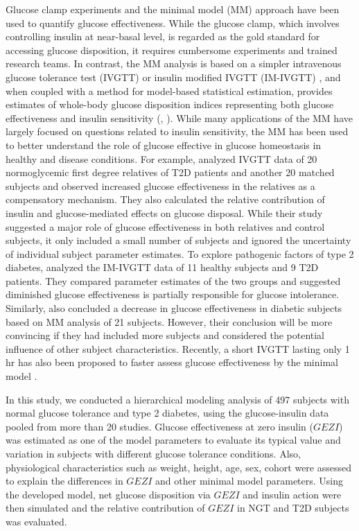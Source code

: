 \documentclass[utf8]{frontiersSCNS} %
\begin{document}
Glucose clamp experiments and the minimal model (MM) approach have been used to quantify glucose effectiveness. While the glucose clamp, which involves controlling insulin at near-basal level, is regarded as the gold standard for accessing glucose disposition, it requires cumbersome experiments and trained research teams. In contrast, the MM analysis is based on a simpler intravenous glucose tolerance test (IVGTT) or insulin modified IVGTT (IM-IVGTT) , and when coupled with a method for model-based statistical estimation, provides estimates of whole-body glucose disposition indices representing both glucose effectiveness and insulin sensitivity (\citet{bergman_equ}, \citet{jan_equ}). While many applications of the MM have largely focused on questions related to insulin sensitivity, the MM has been used to better understand the role of glucose effective in glucose homeostasis in healthy and disease conditions. For example, \citet{jan_relative} analyzed IVGTT data of 20 normoglycemic first degree relatives of T2D patients and another 20 matched subjects and observed increased glucose effectiveness in the relatives as a compensatory mechanism. They also calculated the relative contribution of insulin and glucose-mediated effects on glucose disposal. While their study suggested a major role of glucose effectiveness in both relatives and control subjects, it only included a small number of subjects and ignored the uncertainty of individual subject parameter estimates. To explore pathogenic factors of type 2 diabetes, \citet{ataru_1992} analyzed the IM-IVGTT data of 11 healthy subjects and 9 T2D patients. They compared parameter estimates of the two groups and suggested diminished glucose effectiveness is partially responsible for glucose intolerance. Similarly, \citet{welch_1990} also concluded a decrease in glucose effectiveness in diabetic subjects based on MM analysis of 21 subjects. However, their conclusion will be more convincing if they had included more subjects and considered the potential influence of other subject characteristics. Recently, a short IVGTT lasting only 1 hr has also been proposed to faster assess glucose effectiveness by the minimal model \citep{Morettini2018}. 

In this study, we conducted a hierarchical modeling analysis of 497 subjects with normal glucose tolerance and type 2 diabetes, using the glucose-insulin data pooled from more than 20 studies. Glucose effectiveness at zero insulin ($GEZI$) was estimated as one of the model parameters to evaluate its typical value and variation in subjects with different glucose tolerance conditions. Also, physiological characteristics such as weight, height, age, sex, cohort were assessed to explain the differences in $GEZI$ and other minimal model parameters. Using the developed model, net glucose disposition via $GEZI$ and insulin action were then simulated and the relative contribution of $GEZI$ in NGT and T2D subjects was evaluated.  
\end{document}

